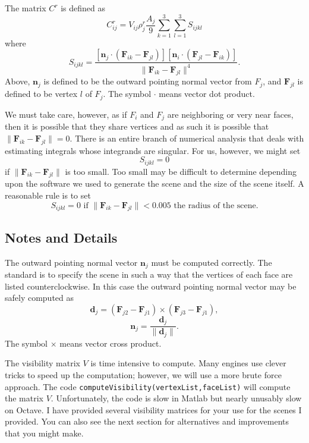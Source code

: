 \documentclass{article}
\renewcommand{\v}[1]{\mathbf{#1}}
\begin{document}
The matrix $C^r$ is defined as 
\[C^r_{ij}=V_{ij}\rho_j^r\frac{A_j}{9}\sum_{k=1}^3\sum_{l=1}^3 S_{ijkl}\]
where 
\[S_{ijkl} = \frac{\left[\v n_j\cdot\left(\v F_{ik}-\v F_{jl}\right)\right] \left[ \v n_i\cdot \left(\v F_{jl}-\v F_{ik} \right)\right] }{\|\v F_{ik}-\v F_{jl} \|^4}.\]
Above, $\v n_j$ is defined to be the outward pointing normal vector from $F_j$, and $\v F_{jl}$ is defined to be vertex $l$ of $F_j$. The symbol $\cdot$ means vector dot product. 

We must take care, however, as if $F_i$ and $F_j$ are neighboring or very near faces, then it is possible that they share vertices and as such it is possible that $\|\v F_{ik}-\v F_{jl}\|=0$.  There is an entire branch of numerical analysis that deals with estimating integrals whose integrands are singular.  For us, however, we might set 
\[S_{ijkl}=0\]
if $ \|\v F_{ik}-\v F_{jl} \|$ is too small. Too small may be difficult to determine depending upon the software we used to generate the scene and the size of the scene itself.  A reasonable rule is to set 
\[S_{ijkl}=0 \text{ if } \|\v F_{ik}-\v F_{jl} \|< 0.005 \text{ the radius of the scene.} \]

\subsection*{Notes and Details}
The outward pointing normal vector $\v n_{j}$ must be computed correctly.  The standard is to specify the scene in such a way that the vertices of each face are listed counterclockwise.  In this case the outward pointing normal vector may be safely computed as 
\[\v d_{j}=\left(\v F_{j2}-\v F_{j1}\right) \times \left(\v F_{j3}-\v F_{j1} \right),\]
\[\v n_j=\frac{\v d_j}{\|\v d_j\|}.\]
The symbol $\times$ means vector cross product. 

The visibility matrix $V$ is time intensive to compute.  Many engines use clever tricks to speed up the computation; however, we will use a more brute force approach.  The code \texttt{computeVisibility(vertexList,faceList)} will compute the matrix $V$.  Unfortunately, the code is slow in Matlab but nearly unusably slow on Octave.  I have provided several visibility matrices for your use for the scenes I provided. You can also see the next section for alternatives and improvements that you might make. 
\end{document}
